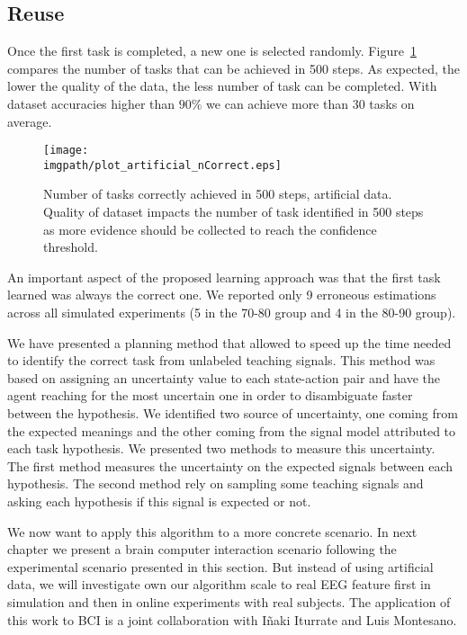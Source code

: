 \subsection{Reuse}

Once the first task is completed, a new one is selected randomly. Figure~\ref{fig:nCorrectArtificial} compares the number of tasks that can be achieved in 500 steps. As expected, the lower the quality of the data, the less number of task can be completed. With dataset accuracies higher than $90\%$ we can achieve more than 30 tasks on average.

\begin{figure}[!ht]
    \centering
    \texttt{[image: \\imgpath/plot\_artificial\_nCorrect.eps]}
    \caption{Number of tasks correctly achieved in 500 steps, artificial data. Quality of dataset impacts the number of task identified in 500 steps as more evidence should be collected to reach the confidence threshold.}
    \label{fig:nCorrectArtificial}
\end{figure} 

An important aspect of the proposed learning approach was that the first task learned was always the correct one. We reported only 9 erroneous estimations across all simulated experiments (5 in the 70-80 group and 4 in the 80-90 group).


\transition

We have presented a planning method that allowed to speed up the time needed to identify the correct task from unlabeled teaching signals. This method was based on assigning an uncertainty value to each state-action pair and have the agent reaching for the most uncertain one in order to disambiguate faster between the hypothesis. We identified two source of uncertainty, one coming from the expected meanings and the other coming from the signal model attributed to each task hypothesis. We presented two methods to measure this uncertainty. The first method measures the uncertainty on the expected signals between each hypothesis. The second method rely on sampling some teaching signals and asking each hypothesis if this signal is expected or not.

We now want to apply this algorithm to a more concrete scenario. In next chapter we present a brain computer interaction scenario following the experimental scenario presented in this section. But instead of using artificial data, we will investigate own our algorithm scale to real EEG feature first in simulation and then in online experiments with real subjects. The application of this work to BCI is a joint collaboration with I{\~n}aki Iturrate and Luis Montesano.
